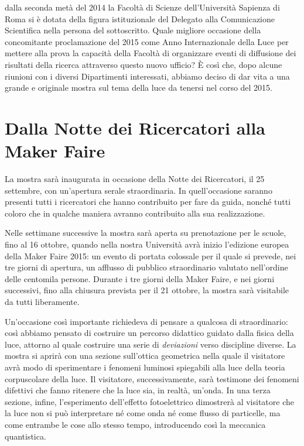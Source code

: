  dalla seconda metà del 2014 la Facoltà di Scienze dell'Università Sapienza di Roma si è dotata della figura istituzionale del Delegato alla Comunicazione Scientifica nella persona del sottoscritto. Quale migliore occasione della concomitante proclamazione del 2015 come Anno Internazionale della Luce per mettere alla prova la capacità della Facoltà di organizzare eventi di diffusione dei risultati della ricerca attraverso questo nuovo ufficio?
È così che, dopo alcune riunioni con i diversi Dipartimenti interessati, abbiamo deciso di dar vita a una grande e originale mostra sul tema della luce da tenersi nel corso del 2015.

\section*{Dalla Notte dei Ricercatori alla Maker Faire}
La mostra sarà inaugurata in occasione della Notte dei Ricercatori, il 25 settembre, con un'apertura serale straordinaria. In quell'occasione saranno presenti tutti i ricercatori che hanno contribuito per fare da guida, nonché tutti coloro che in qualche maniera avranno contribuito alla sua realizzazione.

Nelle settimane successive la mostra sarà aperta su prenotazione per le scuole, fino al 16 ottobre, quando nella nostra Università avrà inizio l'edizione europea della Maker Faire 2015: un evento di portata colossale per il quale si prevede, nei tre giorni di apertura, un afflusso di pubblico straordinario valutato nell'ordine delle centomila persone. Durante i tre giorni della Maker Faire, e
nei giorni successivi, fino alla chiusura prevista per il 21 ottobre, la mostra sarà visitabile da tutti liberamente.

Un'occasione così importante richiedeva di pensare a qualcosa di straordinario: così abbiamo pensato di costruire un percorso didattico guidato dalla fisica della luce, attorno al quale costruire una serie di \emph{deviazioni} verso discipline diverse. La mostra si aprirà con una sezione sull'ottica geometrica nella quale il visitatore avrà modo di sperimentare i fenomeni luminosi spiegabili alla
luce della teoria corpuscolare della luce. Il visitatore, successivamente, sarà testimone dei fenomeni difettivi che fanno ritenere che la luce sia, in realtà, un'onda. In una terza sezione, infine, l'esperimento dell'effetto fotoelettrico dimostrerà al visitatore che la luce non si può interpretare né come onda né come flusso di particelle, ma come entrambe le cose allo stesso tempo, introducendo così la meccanica quantistica.

